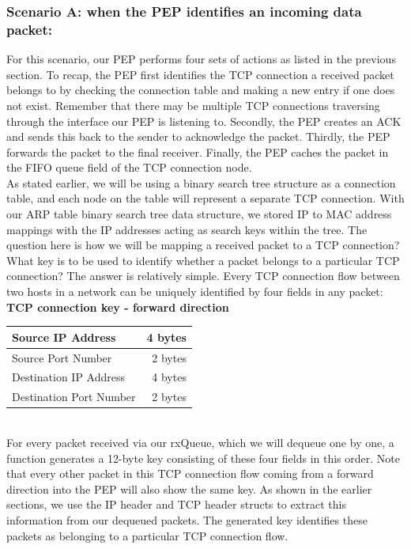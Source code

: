 \subsubsection{Scenario A: when the PEP identifies an incoming data packet:}
For this scenario, our PEP performs four sets of actions as listed in the previous section. To recap, the PEP first identifies the TCP connection a received packet belongs to by checking the connection table and making a new entry if one does not exist. Remember that there may be multiple TCP connections traversing through the interface our PEP is listening to. Secondly, the PEP creates an ACK and sends this back to the sender to acknowledge the packet. Thirdly, the PEP forwards the packet to the final receiver. Finally, the PEP caches the packet in the FIFO queue field of the TCP connection node.  \\

As stated earlier, we will be using a binary search tree structure as a connection table, and each node on the table will represent a separate TCP connection. With our ARP table binary search tree data structure, we stored IP to MAC address mappings with the IP addresses acting as search keys within the tree. The question here is how we will be mapping a received packet to a TCP connection? What key is to be used to identify whether a packet belongs to a particular TCP connection? The answer is relatively simple. Every TCP connection flow between two hosts in a network can be uniquely identified by four fields in any packet:\\

\textbf{TCP connection key - forward direction} \\

\begin{tabular}{|l|r|}
	\hline
	Source IP Address & 4 bytes\\
	\hline
    Source Port Number & 2 bytes\\
	\hline
    Destination IP Address & 4 bytes\\
	\hline
    Destination Port Number & 2 bytes\\
    \hline 
\end{tabular} \\

For every packet received via our rxQueue, which we will dequeue one by one, a function generates a 12-byte key consisting of these four fields in this order. Note that every other packet in this TCP connection flow coming from a forward direction into the PEP will also show the same key. As shown in the earlier sections, we use the IP header and TCP header structs to extract this information from our dequeued packets. The generated key identifies these packets as belonging to a particular TCP connection flow.
\\

